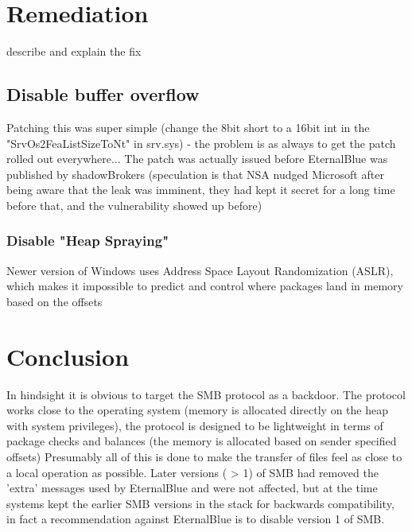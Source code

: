 \documentclass[
	letterpaper, %
	10pt, %
	unnumberedsections, %
	twoside, %
]{LTJournalArticle}
\begin{document}
\section{Remediation} 
describe and explain the fix

\subsection{Disable buffer overflow}
Patching this was super simple (change the 8bit short to a 16bit int in the "SrvOs2FeaListSizeToNt" in srv.sys) - the problem is as always to get the patch rolled out everywhere...
The patch was actually issued before EternalBlue was published by shadowBrokers (speculation is that NSA nudged Microsoft after being aware that the leak was imminent, they had kept it secret for a long time before that, and the vulnerability showed up before)

\subsubsection{Disable "Heap Spraying"}
Newer version of Windows uses Address Space Layout Randomization (ASLR), which makes it impossible to predict and control where packages land in memory based on the offsets 


\section{Conclusion}
In hindsight it is obvious to target the SMB protocol as a backdoor. The protocol works close to the operating system (memory is allocated directly on the heap with system privileges), the protocol is designed to be lightweight in terms of package checks and balances (the memory is allocated based on sender specified offsets) Presumably all of this is done to make the transfer of files feel as close to a local operation as possible. Later versions ( > 1) of SMB had removed the 'extra' messages used by EternalBlue and were not affected, but at the time systems kept the earlier SMB versions in the stack for backwards compatibility, in fact a recommendation against EternalBlue is to disable version 1 of SMB.       




\printbibliography %
\end{document}
